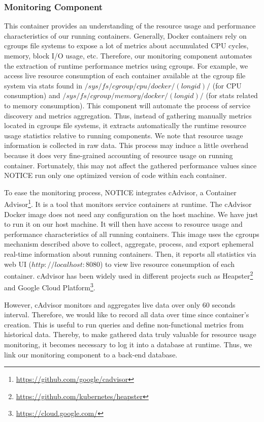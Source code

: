 \subsubsection{Monitoring Component}
This container provides an understanding of the resource usage and performance characteristics of our running containers. Generally, Docker containers rely on cgroups file systems to expose a lot of metrics about accumulated CPU cycles, memory, block I/O usage, etc. Therefore, our monitoring component automates the extraction of runtime performance metrics using cgroups. For example, we access live resource consumption of each container available at the cgroup file system via stats found in $/sys/fs/cgroup/cpu/docker/(longid)/$ (for CPU consumption) and $/sys/fs/cgroup/memory/docker/(longid)/$ (for stats related to memory consumption). This component will automate the process of service discovery and metrics aggregation. Thus, instead of gathering manually metrics located in cgroups file systems, it extracts automatically the runtime resource usage statistics relative to running components. We note that resource usage information is collected in raw data. This process may induce a little overhead because it does very fine-grained accounting of resource usage on running container. Fortunately, this may not affect the gathered performance values since NOTICE run only one optimized version of code within each container.

To ease the monitoring process, NOTICE integrates cAdvisor, a Container Advisor\footnote{\url{https://github.com/google/cadvisor}}. It is a tool that monitors service containers at runtime. 
The cAdvisor Docker image does not need any configuration on the host machine. We have just to run it on our host machine. It will then have access to resource usage and performance characteristics of all running containers. This image uses the cgroups mechanism described above to collect, aggregate, process, and export ephemeral real-time information about running containers. Then, it reports all statistics via web UI ($http://localhost:8080$) to view live resource consumption of each container. cAdvisor has been widely used in different projects such as Heapster\footnote{\url{https://github.com/kubernetes/heapster}} and Google Cloud Platform\footnote{\url{https://cloud.google.com/}}.

However, cAdvisor monitors and aggregates live data over only 60 seconds interval. Therefore, we would like to record all data over time since container's creation. This is useful to run queries and define non-functional metrics from historical data. Thereby, to make gathered data truly valuable for resource usage monitoring, it becomes necessary to log it into a database at runtime. Thus, we link our monitoring component to a back-end database. 
